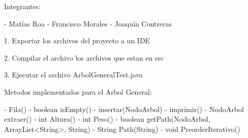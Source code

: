 Integrantes:

- Matías Roa 
- Francisco Morales
- Joaquín Contreras

1. Exportar los archivos del proyecto a un IDE

2. Compilar el archivo los archivos que estan en src

3. Ejecutar el archivo ArbolGeneralTest.java
 

Metodos implementados para el Arbol General:

- Fila()
- boolean isEmpty()
- insertar(NodoArbol)
- imprimir()
- NodoArbol extraer()
- int Altura()
- int Peso()
- boolean getPath(NodoArbol, ArrayList<String>, String)
- String Path(String)
- void PreorderIterativo()




